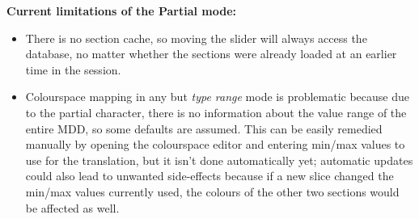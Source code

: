 \documentclass[11pt]{article}
\begin{document}
\textbf{Current limitations of the Partial mode:}
\begin{itemize}
\item
There is no section cache, so moving the slider will always access the database,
no matter whether the sections were already loaded at an earlier time in the session.
\item
Colourspace mapping in any but \emph{type range} mode is problematic because due to
the partial character, there is no information about the value range of the entire
MDD, so some defaults are assumed. This can be easily remedied manually by opening
the colourspace editor and entering min/max values to use for the translation, but
it isn't done automatically yet; automatic updates could also lead to unwanted
side-effects because if a new slice changed the min/max values currently used,
the colours of the other two sections would be affected as well.
\end{itemize}
\end{document}
